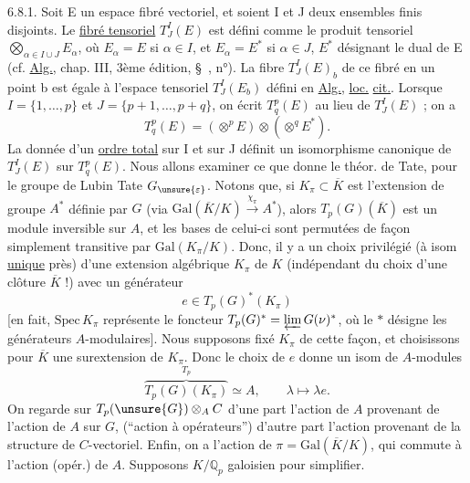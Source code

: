 6.8.1. Soit E un espace fibré vectoriel, et soient I et J deux ensembles finis disjoints. Le \uline{fibré tensoriel} $T_J^I(E)$ est défini comme le produit tensoriel $\bigotimes_{\alpha\in I\cup J}E_\alpha$, où $E_\alpha=E$ si $\alpha\in I$, et $E_\alpha=E^*$ si $\alpha\in J$, $E^*$ désignant le dual de E (cf. \uline{Alg.}, chap. III, 3ème édition, \S\ \qquad, n°\qquad). La fibre $T_J^I(E)_b$ de ce fibré en un point b est égale à l'espace tensoriel $T_J^I(E_b)$ défini en \uline{Alg.}, \uline{loc.} \uline{cit.}. Lorsque $I=\{1,\ldots,p\}$ et $J=\{p+1,\ldots,p+q\}$, on écrit $T_q^p(E)$ au lieu de $T_J^I(E)$ ; on a
\[
T_q^p(E)=(\otimes^p E)\otimes(\otimes^q E^*).
\]
La donnée d'un \uline{ordre total} sur I et sur J définit un isomorphisme canonique de $T_J^I(E)$ sur $T_q^p(E)$.
Nous allons examiner  ce que donne le théor. de Tate, pour le groupe de Lubin Tate $G_{\unsure{\varepsilon}}$.
Notons que, si $K_\pi\subset\overline K$ est l'extension  de groupe $A^*$ définie par $G$ (via $\mathrm{Gal}(\overline K/K)\xrightarrow{\chi_\pi}A^*$), alors  $T_p(G)(\overline K)$ est un module inversible sur $A$, et les bases de celui-ci sont permutées de façon simplement transitive par $\mathrm{Gal}(K_\pi/K)$. Donc, il y a un choix privilégié (à isom \uline{unique} près) d'une extension algébrique $K_\pi$ de $K$ (indépendant du choix d'une clôture $\overline K$ !) avec un générateur
\[
e\in T_p(G)^*(K_\pi)
\]
[en fait, $\mathrm{Spec}\,K_\pi$ représente le foncteur $T_p(G)^*=\varprojlim G(\nu)^*$, où le $*$ désigne les générateurs  $A$-modulaires]. Nous supposons fixé $K_\pi$ de cette façon, et choisissons pour $\overline K$ une surextension de $K_\pi$. Donc le choix de $e$ donne un isom de $A$-modules
\[
\overbrace{T_p(G)(K_\pi)}^{T_p}\simeq A,\qquad\lambda\longmapsto\lambda e.
\]
On regarde sur $T_p(\unsure{G})\otimes_A C$ d'une part l'action de $A$ provenant de l'action de $A$ sur $G$, (``action à opérateurs'') d'autre part l'action provenant de la structure de $C$-vectoriel. Enfin, on a l'action de $\pi=\mathrm{Gal}(\overline K/K)$, qui commute à l'action (opér.) de $A$. Supposons $K/\mathbb Q_p$ galoisien pour simplifier.

